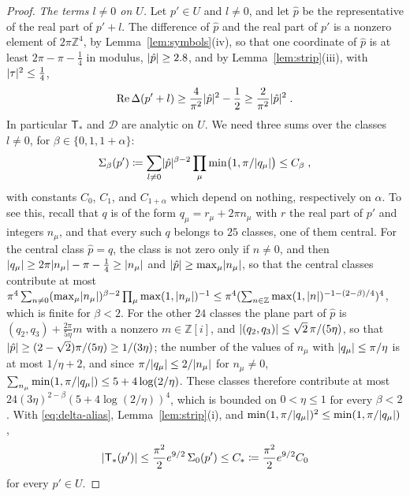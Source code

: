 \documentclass[11pt]{preprint}
\DeclarePairedDelimiter{\abs}{\lvert}{\rvert}
\numberwithin{equation}{section}
\theoremstyle{definition}
\theoremstyle{remark}
\theoremstyle{plain}
\begin{document}
\begin{proof}
\emph{The terms $l \neq 0$ on $U$.} Let $p' \in U$ and $l \neq 0$, and let $\hat p$ be the representative of the real part of $p' + l$. The difference of $\hat p$ and the real part of $p'$ is a nonzero element of $2\pi\mathbb Z^4$, by Lemma~\ref{lem:symbols}(iv), so that one coordinate of $\hat p$ is at least $2\pi - \pi - \frac14$ in modulus, $\abs{\hat p} \geq 2.8$, and by Lemma~\ref{lem:strip}(iii), with $\abs\tau^2 \leq \frac14$,
\begin{equation}\label{eq:delta-alias}
    \operatorname{Re}\Delta(p' + l) \geq \frac{4}{\pi^2}\abs{\hat p}^2 - \frac12 \geq \frac{2}{\pi^2}\abs{\hat p}^2\;.
\end{equation}
In particular $\mathsf T_*$ and $\mathcal D$ are analytic on $U$. We need three sums over the classes $l \neq 0$, for $\beta \in \{ 0, 1, 1 + \alpha \}$:
\begin{equation}\label{eq:alias-sums}
    \Sigma_\beta(p') \coloneqq \sum_{l \neq 0}\abs{\hat p}^{\beta-2}\prod_\mu\min\bigl(1, \pi/\abs{q_\mu}\bigr) \leq C_\beta\;,
\end{equation}
with constants $C_0$, $C_1$, and $C_{1+\alpha}$ which depend on nothing, respectively on $\alpha$. To see this, recall that $q$ is of the form $q_\mu = r_\mu + 2\pi n_\mu$ with $r$ the real part of $p'$ and integers $n_\mu$, and that every such $q$ belongs to $25$ classes, one of them central. For the central class $\hat p = q$, the class is not zero only if $n \neq 0$, and then $\abs{q_\mu} \geq 2\pi\abs{n_\mu} - \pi - \frac14 \geq \abs{n_\mu}$ and $\abs{\hat p} \geq \max_\mu\abs{n_\mu}$, so that the central classes contribute at most $\pi^4\sum_{n \neq 0}(\max_\mu\abs{n_\mu})^{\beta-2}\prod_\mu\max(1, \abs{n_\mu})^{-1} \leq \pi^4(\sum_{n \in \mathbb Z}\max(1, \abs n)^{-1-(2-\beta)/4})^4$, which is finite for $\beta < 2$. For the other $24$ classes the plane part of $\hat p$ is $(q_2, q_3) + \frac{2\pi}{5\eta}m$ with a nonzero $m \in \mathbb Z[i]$, and $\abs{(q_2, q_3)} \leq \sqrt2\,\pi/(5\eta)$, so that $\abs{\hat p} \geq (2 - \sqrt2)\pi/(5\eta) \geq 1/(3\eta)$; the number of the values of $n_\mu$ with $\abs{q_\mu} \leq \pi/\eta$ is at most $1/\eta + 2$, and since $\pi/\abs{q_\mu} \leq 2/\abs{n_\mu}$ for $n_\mu \neq 0$, $\sum_{n_\mu}\min(1, \pi/\abs{q_\mu}) \leq 5 + 4\log(2/\eta)$. These classes therefore contribute at most $24(3\eta)^{2-\beta}(5 + 4\log(2/\eta))^4$, which is bounded on $0 < \eta \leq 1$ for every $\beta < 2$. With \eqref{eq:delta-alias}, Lemma~\ref{lem:strip}(i), and $\min(1, \pi/\abs{q_\mu})^2 \leq \min(1, \pi/\abs{q_\mu})$,
\begin{equation}\label{eq:t-star-bound}
    \abs{\mathsf T_*(p')} \leq \frac{\pi^2}{2}e^{9/2}\,\Sigma_0(p') \leq C_* \coloneqq \frac{\pi^2}{2}e^{9/2}C_0
\end{equation}
for every $p' \in U$.


\end{proof}
\end{document}
